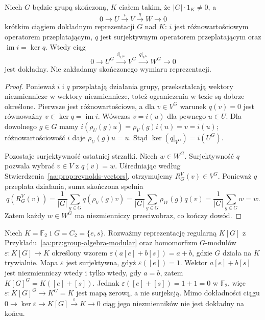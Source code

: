 \begin{wniosek}
\label{aa:cor:invariants-exact}
Niech $G$ będzie grupą skończoną, $K$ ciałem takim, że
$|G|\cdot1_K\ne0$, a
\[
0\longrightarrow U\xrightarrow{\,i\,}V
 \xrightarrow{\,q\,}W\longrightarrow0
\]
krótkim ciągiem dokładnym reprezentacji $G$ nad $K$:
$i$ jest różnowartościowym operatorem przeplatającym,
$q$ jest surjektywnym operatorem przeplatającym oraz
$\operatorname{im}i=\ker q$. Wtedy ciąg
\[
0\longrightarrow U^G\xrightarrow{\,i|_{U^G}\,}V^G
 \xrightarrow{\,q|_{V^G}\,}W^G\longrightarrow0
\]
jest dokładny. Nie zakładamy skończonego wymiaru reprezentacji.
\end{wniosek}
\begin{proof}
Ponieważ $i$ i $q$ przeplatają działania grupy, przekształcają
wektory niezmiennicze w wektory niezmiennicze, toteż ograniczenia
w tezie są dobrze określone. Pierwsze jest różnowartościowe,
a dla $v\in V^G$ warunek $q(v)=0$ jest równoważny
$v\in\ker q=\operatorname{im}i$. Wówczas $v=i(u)$ dla
pewnego $u\in U$. Dla dowolnego $g\in G$ mamy
$i(\rho_U(g)u)=\rho_V(g)i(u)=v=i(u)$;
różnowartościowość $i$ daje $\rho_U(g)u=u$.
Stąd $\ker(q|_{V^G})=i(U^G)$.

Pozostaje surjektywność ostatniej strzałki. Niech $w\in W^G$.
Surjektywność $q$ pozwala wybrać $v\in V$ z $q(v)=w$.
Uśredniając według Stwierdzenia~\ref{aa:prop:reynolds-vectors},
otrzymujemy $R_G^V(v)\in V^G$. Ponieważ $q$ przeplata
działania, suma skończona spełnia
\[
q(R_G^V(v))=\frac1{|G|}\sum_{g\in G}q(\rho_V(g)v)
=\frac1{|G|}\sum_{g\in G}\rho_W(g)q(v)
=\frac1{|G|}\sum_{g\in G}w=w.
\]
Zatem każdy $w\in W^G$ ma niezmienniczy przeciwobraz,
co kończy dowód.
\end{proof}
\begin{przyklad}
\label{aa:prz:invariants-not-exact-modular}
Niech $K=\mathbb F_2$ i $G=C_2=\{e,s\}$.
Rozważmy reprezentację regularną $K[G]$ z
Przykładu~\ref{aa:prz:group-algebra-modular} oraz homomorfizm
$G$-modułów $\varepsilon:K[G]\to K$ określony wzorem
$\varepsilon(a[e]+b[s])=a+b$, gdzie $G$ działa na $K$
trywialnie. Mapa $\varepsilon$ jest surjektywna, gdyż
$\varepsilon([e])=1$. Wektor $a[e]+b[s]$ jest niezmienniczy
wtedy i tylko wtedy, gdy $a=b$, zatem
$K[G]^G=K([e]+[s])$. Jednak
$\varepsilon([e]+[s])=1+1=0$ w $\mathbb F_2$, więc
$\varepsilon:K[G]^G\to K^G=K$ jest mapą zerową,
a nie surjekcją. Mimo dokładności ciągu
$0\to\ker\varepsilon\to K[G]\xrightarrow{\varepsilon}K\to0$
ciąg jego niezmienników nie jest dokładny na końcu.
\end{przyklad}

